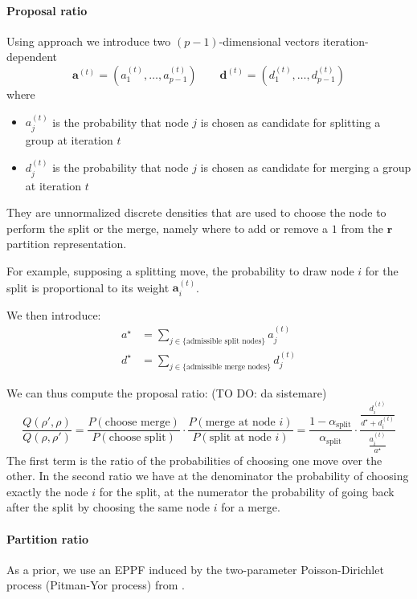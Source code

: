 \paragraph{Proposal ratio}


Using \parencite{bensonAdaptiveMCMCMultiple2018} approach we introduce two $( p-1)$-dimensional vectors iteration-dependent
\begin{equation*}
\mathbf{a}^{( t)} =( a_{1}^{( t)} ,\dotsc ,a_{p-1}^{( t)}) \qquad \mathbf{d}^{( t)} =( d_{1}^{( t)} ,\dotsc ,d_{p-1}^{( t)})
\end{equation*}
where
\begin{itemize}
\item $a_{j}^{( t)}$ is the probability that node $j$ is chosen as candidate for splitting a group at iteration $t$
\item $d_{j}^{( t)}$ is the probability that node $j$ is chosen as candidate for merging a group at iteration $t$
\end{itemize}
They are unnormalized discrete densities that are used to choose the node to perform the split or the merge, namely where to add or remove a $1$ from the $\bm{r}$ partition representation.

For example, supposing a splitting move, the probability to draw node $i$ for the split is proportional to its weight $\bm{a}_{i}^{(t)}$.

We then introduce:
\begin{align*}
    a^{\star} &= \sum\nolimits_{j\in \{\text{admissible split nodes}\}}{a_{j}^{(t)}}\\
    d^{\star} &= \sum\nolimits_{j\in \{\text{admissible merge nodes}\}}{d_{j}^{(t)}}
\end{align*}

We can thus compute the proposal ratio: (TO DO: da sistemare)
\[
    \frac{Q(\rho',\rho)}{Q(\rho,\rho')}
    =
    \frac{P(\text{choose merge})}{P(\text{choose split})}
    \cdot 
    \frac{P(\text{merge at node $i$})}{P(\text{split at node $i$})}
    =
    \frac{1-\alpha_{\text{split}}}{\alpha_{\text{split}}}
    \cdot
    \frac{\frac{d_{i}^{(t)}}{d^{\star}+d_{i}^{(t)}}}{\frac{a_{i}^{(t)}}{a^{\star}}}
\]
The first term is the ratio of the probabilities of choosing one move over the other. In the second ratio we have at the denominator the probability of choosing exactly the node $i$ for the split, at the numerator the probability of going back after the split  by choosing the same node $i$ for a merge.
\paragraph{Partition ratio}
As a prior, we use an EPPF induced by the two-parameter Poisson-Dirichlet process (Pitman-Yor process) from \parencite{martinezNonparametricChangePoint2014}.

